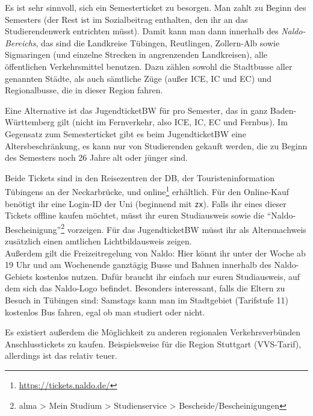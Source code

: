 

Es ist sehr sinnvoll, sich ein Semesterticket zu besorgen.  Man zahlt
  zu Beginn des Semesters \semesterticketpreis (der Rest ist im Sozialbeitrag
  enthalten, den ihr an das Studierendenwerk entrichten müsst).  Damit
  kann man dann innerhalb des \emph{Naldo-Bereichs}, das sind die
  Landkreise Tübingen, Reutlingen, Zollern-Alb sowie Sigmaringen
  (und einzelne Strecken in angrenzenden Landkreisen), alle
  öffentlichen Verkehrsmittel benutzen. Dazu zählen sowohl die
  Stadtbusse aller genannten Städte, als auch sämtliche Züge (außer ICE, IC und EC) und
  Regionalbusse, die in dieser Region fahren.

Eine Alternative ist das JugendticketBW für \jugendticketbwpreis pro Semester,
  das in ganz Baden-Württemberg gilt (nicht im Fernverkehr, also ICE, IC, EC und Fernbus).
  Im Gegensatz zum Semesterticket gibt es beim JugendticketBW eine Altersbeschränkung,
  es kann nur von Studierenden gekauft werden, die zu Beginn des Semesters noch 26 Jahre alt oder jünger sind.

Beide Tickets sind in den Reisezentren der DB, der Touristeninformation Tübingens an der Neckarbrücke, und
  online\footnote{\url{https://tickets.naldo.de/}} erhältlich.
  Für den Online-Kauf benötigt ihr eine Login-ID der Uni (beginnend mit \texttt{zx}). Falls ihr eines
  dieser Tickets offline kaufen möchtet, müsst ihr euren Studiausweis sowie die "`Naldo-Bescheinigung"'\footnote{alma > Mein Studium > Studienservice > Bescheide/Bescheinigungen}
  vorzeigen. Für das JugendticketBW müsst ihr als Altersnachweis zusätzlich einen amtlichen Lichtbildausweis zeigen. \\
  Außerdem gilt die Freizeitregelung von Naldo: Hier könnt ihr unter der Woche ab 19 Uhr und am Wochenende ganztägig
  Busse und Bahnen innerhalb des Naldo-Gebiets kostenlos nutzen. Dafür braucht ihr einfach nur euren Studiausweis, auf
  dem sich das Naldo-Logo befindet.
  Besonders interessant, falls die Eltern zu Besuch in Tübingen sind: Samstags kann man im Stadtgebiet (Tarifstufe 11) kostenlos Bus fahren, egal ob man studiert oder nicht.

Es existiert außerdem die Möglichkeit zu anderen regionalen Verkehrsverbünden Anschlusstickets zu kaufen.
Beispielsweise für die Region Stuttgart (VVS-Tarif), allerdings ist das relativ teuer.

